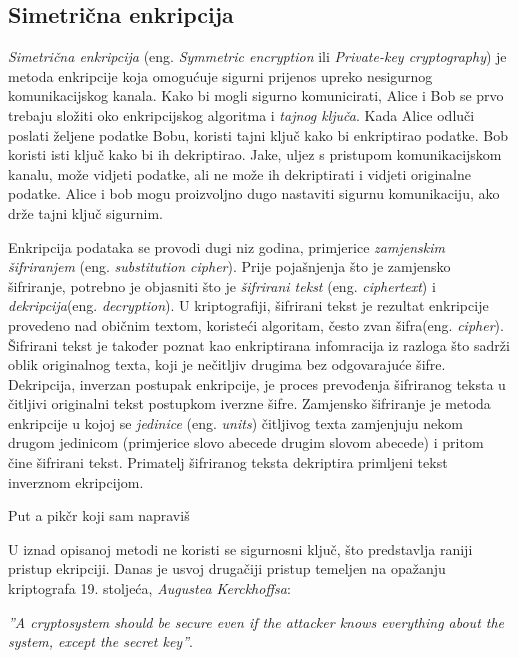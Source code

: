 \documentclass[times, utf8, diplomski]{fer}
\begin{document}
\subsection{Simetrična enkripcija}
\textit{Simetrična enkripcija} (eng. \textit{Symmetric encryption} ili \textit{Private-key cryptography}) je metoda enkripcije koja omogućuje sigurni prijenos upreko nesigurnog komunikacijskog kanala. Kako bi mogli sigurno komunicirati, Alice i Bob se prvo trebaju složiti oko enkripcijskog algoritma i \textit{tajnog ključa}. Kada Alice odluči poslati željene podatke Bobu, koristi tajni ključ kako bi enkriptirao podatke. Bob koristi isti ključ kako bi ih dekriptirao. Jake, uljez s pristupom komunikacijskom kanalu, može vidjeti podatke, ali ne može ih dekriptirati i vidjeti originalne podatke. Alice i bob mogu proizvoljno dugo nastaviti sigurnu komunikaciju, ako drže tajni ključ sigurnim.

\medskip

Enkripcija podataka se provodi dugi niz godina, primjerice \textit{zamjenskim šifriranjem}  (eng. \textit{substitution cipher}). Prije pojašnjenja što je zamjensko šifriranje, potrebno je objasniti što je \textit{šifrirani tekst} (eng. \textit{ciphertext}) i \textit{dekripcija}(eng. \textit{decryption}). U kriptografiji, šifrirani tekst je rezultat enkripcije provedeno nad običnim textom, koristeći algoritam, često zvan šifra(eng. \textit{cipher}). Šifrirani tekst je također poznat kao enkriptirana infomracija iz razloga što sadrži oblik originalnog texta, koji je nečitljiv drugima bez odgovarajuće šifre. Dekripcija, inverzan postupak enkripcije, je proces prevođenja šifriranog teksta u čitljivi originalni tekst postupkom iverzne šifre.\newline
Zamjensko šifriranje je metoda enkripcije u kojoj se \textit{jedinice} (eng. \textit{units}) čitljivog texta zamjenjuju nekom drugom jedinicom (primjerice slovo abecede drugim slovom abecede) i pritom čine šifrirani tekst. Primatelj šifriranog teksta dekriptira primljeni tekst inverznom ekripcijom.

\medskip

 Put a pikčr koji sam napraviš

\medskip

U iznad opisanoj metodi ne koristi se sigurnosni ključ, što predstavlja raniji pristup ekripciji. Danas je usvoj drugačiji pristup temeljen na opažanju kriptografa 19. stoljeća, \textit{Augustea Kerckhoffsa}:

\textit{''A cryptosystem should be secure even if the attacker knows everything about the system, except the secret key''}.
\end{document}
